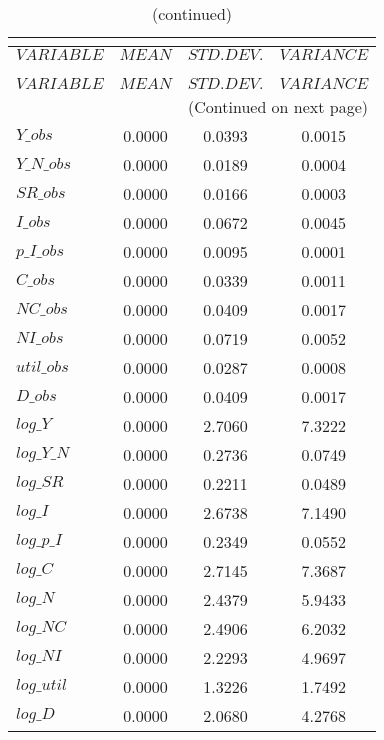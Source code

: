  
\begin{center}
\begin{longtable}{lccc} 
\caption{THEORETICAL MOMENTS}\\
 \label{Table:th_moments}\\
\toprule 
$VARIABLE   $	 & 	 $         MEAN$	 & 	 $    STD. DEV.$	 & 	 $     VARIANCE$\\
\midrule \endfirsthead 
\caption{(continued)}\\
 \toprule \\ 
$VARIABLE   $	 & 	 $         MEAN$	 & 	 $    STD. DEV.$	 & 	 $     VARIANCE$\\
\midrule \endhead 
\midrule \multicolumn{4}{r}{(Continued on next page)} \\ \bottomrule \endfoot 
\bottomrule \endlastfoot 
$Y\_obs     $	 & 	       0.0000	 & 	       0.0393	 & 	       0.0015 \\ 
$Y\_N\_obs  $	 & 	       0.0000	 & 	       0.0189	 & 	       0.0004 \\ 
$SR\_obs    $	 & 	       0.0000	 & 	       0.0166	 & 	       0.0003 \\ 
$I\_obs     $	 & 	       0.0000	 & 	       0.0672	 & 	       0.0045 \\ 
$p\_I\_obs  $	 & 	       0.0000	 & 	       0.0095	 & 	       0.0001 \\ 
$C\_obs     $	 & 	       0.0000	 & 	       0.0339	 & 	       0.0011 \\ 
$NC\_obs    $	 & 	       0.0000	 & 	       0.0409	 & 	       0.0017 \\ 
$NI\_obs    $	 & 	       0.0000	 & 	       0.0719	 & 	       0.0052 \\ 
$util\_obs  $	 & 	       0.0000	 & 	       0.0287	 & 	       0.0008 \\ 
$D\_obs     $	 & 	       0.0000	 & 	       0.0409	 & 	       0.0017 \\ 
$log\_Y     $	 & 	       0.0000	 & 	       2.7060	 & 	       7.3222 \\ 
$log\_Y\_N  $	 & 	       0.0000	 & 	       0.2736	 & 	       0.0749 \\ 
$log\_SR    $	 & 	       0.0000	 & 	       0.2211	 & 	       0.0489 \\ 
$log\_I     $	 & 	       0.0000	 & 	       2.6738	 & 	       7.1490 \\ 
$log\_p\_I  $	 & 	       0.0000	 & 	       0.2349	 & 	       0.0552 \\ 
$log\_C     $	 & 	       0.0000	 & 	       2.7145	 & 	       7.3687 \\ 
$log\_N     $	 & 	       0.0000	 & 	       2.4379	 & 	       5.9433 \\ 
$log\_NC    $	 & 	       0.0000	 & 	       2.4906	 & 	       6.2032 \\ 
$log\_NI    $	 & 	       0.0000	 & 	       2.2293	 & 	       4.9697 \\ 
$log\_util  $	 & 	       0.0000	 & 	       1.3226	 & 	       1.7492 \\ 
$log\_D     $	 & 	       0.0000	 & 	       2.0680	 & 	       4.2768 \\ 
\end{longtable}
 \end{center}
